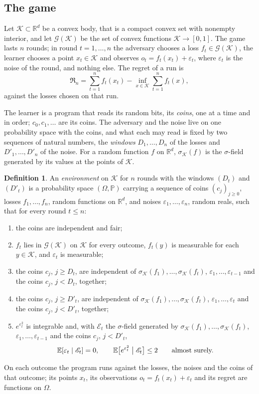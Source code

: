 \documentclass[11pt]{amsart}
\theoremstyle{definition}
\newtheorem{definition}[theorem]{Definition}
\numberwithin{equation}{section}
\newcommand{\R}{\mathbb{R}}
\newcommand{\E}{\mathbb{E}}
\newcommand{\Prob}{\mathbb{P}}
\newcommand{\cK}{\mathcal{K}}
\newcommand{\cG}{\mathscr{G}}
\newcommand{\Reg}{\mathfrak{R}}
\begin{document}
\subsection{The game}\label{sec:intro-game}

Let $\cK\subset\R^d$ be a convex body, that is a compact convex set with nonempty interior, and let $\cG(\cK)$ be the set of convex functions $\cK\to[0,1]$. The game lasts $n$ rounds; in round $t=1,\dots,n$ the adversary chooses a loss $f_t\in\cG(\cK)$, the learner chooses a point $x_t\in\cK$ and observes $o_t=f_t(x_t)+\varepsilon_t$, where $\varepsilon_t$ is the noise of the round, and nothing else. The regret of a run is
\begin{equation}\label{eq:regret-run}
\Reg_n=\sum_{t=1}^n f_t(x_t)-\inf_{x\in\cK}\sum_{t=1}^n f_t(x),
\end{equation}
against the losses chosen on that run.

The learner is a program that reads its random bits, its \emph{coins}, one at a time and in order; $c_0,c_1,\dots$ are its coins. The adversary and the noise live on one probability space with the coins, and what each may read is fixed by two sequences of natural numbers, the \emph{windows} $D_1,\dots,D_n$ of the losses and $D'_1,\dots,D'_n$ of the noise. For a random function $f$ on $\R^d$, $\sigma_\cK(f)$ is the $\sigma$-field generated by its values at the points of $\cK$.

\begin{definition}\label{def:env}
An \emph{environment} on $\cK$ for $n$ rounds with the windows $(D_t)$ and $(D'_t)$ is a probability space $(\Omega,\Prob)$ carrying a sequence of coins $(c_j)_{j\ge0}$, losses $f_1,\dots,f_n$, random functions on $\R^d$, and noises $\varepsilon_1,\dots,\varepsilon_n$, random reals, such that for every round $t\le n$:
\begin{enumerate}[label=(\alph*)]
\item the coins are independent and fair;
\item $f_t$ lies in $\cG(\cK)$ on $\cK$ for every outcome, $f_t(y)$ is measurable for each $y\in\cK$, and $\varepsilon_t$ is measurable;
\item the coins $c_j$, $j\ge D_t$, are independent of $\sigma_\cK(f_1),\dots,\sigma_\cK(f_t)$, $\varepsilon_1,\dots,\varepsilon_{t-1}$ and the coins $c_j$, $j<D_t$, together;
\item the coins $c_j$, $j\ge D'_t$, are independent of $\sigma_\cK(f_1),\dots,\sigma_\cK(f_t)$, $\varepsilon_1,\dots,\varepsilon_t$ and the coins $c_j$, $j<D'_t$, together;
\item $e^{\varepsilon_t^2}$ is integrable and, with $\mathscr E_t$ the $\sigma$-field generated by $\sigma_\cK(f_1),\dots,\sigma_\cK(f_t)$, $\varepsilon_1,\dots,\varepsilon_{t-1}$ and the coins $c_j$, $j<D'_t$,
\[
\E[\varepsilon_t\mid\mathscr E_t]=0,\qquad\E\bigl[e^{\varepsilon_t^2}\bigm|\mathscr E_t\bigr]\le2\qquad\text{almost surely.}
\]
\end{enumerate}
On each outcome the program runs against the losses, the noises and the coins of that outcome; its points $x_t$, its observations $o_t=f_t(x_t)+\varepsilon_t$ and its regret are functions on $\Omega$.
\end{definition}
\end{document}
